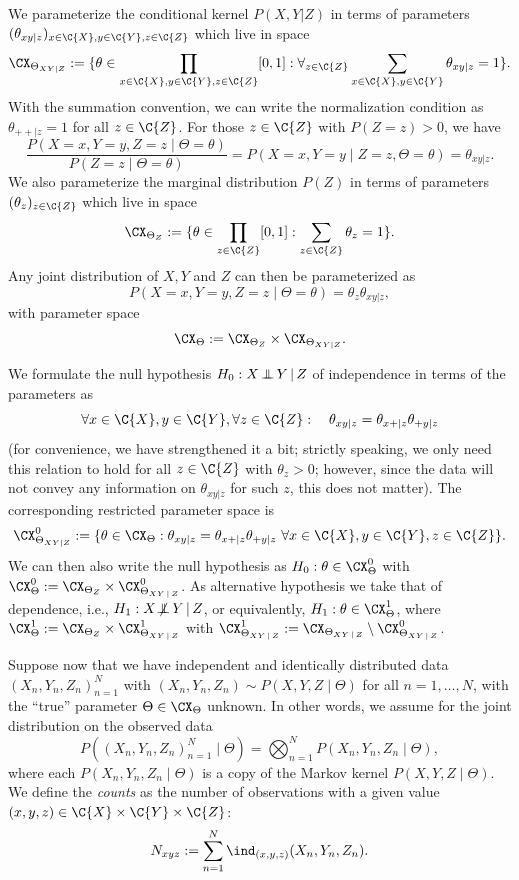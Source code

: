 We parameterize the conditional kernel $P(X,Y | Z)$ in terms of parameters
$(\theta_{xy|z})_{x\in\C{X},y\in\C{Y},z\in\C{Z}}$ which live in space
$$\CX_{\Theta_{XY|Z}} := %
\{ \theta \in \prod_{x\in\C{X},y\in\C{Y},z\in\C{Z}} [0,1] : \forall_{z\in\C{Z}} \sum_{x\in\C{X},y\in\C{Y}} \theta_{xy|z} = 1\}.$$
With the summation convention, we can write the normalization condition as $\theta_{++|z} = 1$ for all $z \in \C{Z}$.
For those $z\in\C{Z}$ with $P(Z = z) > 0$, we have 
$$\frac{P(X = x, Y = y, Z = z \mid \Theta = \theta)}{P(Z=z \mid \Theta=\theta)} = P(X = x, Y = y \mid Z=z, \Theta=\theta) = \theta_{xy|z}.$$
We also parameterize the marginal distribution $P(Z)$ in terms of parameters
$(\theta_z)_{z\in\C{Z}}$ which live in space
$$\CX_{\Theta_Z} := \{ \theta \in \prod_{z\in\C{Z}} [0,1] : \sum_{z\in\C{Z}} \theta_z = 1\}.$$
Any joint distribution of $X,Y$ and $Z$ can then be parameterized as
$$P(X=x,Y=y,Z=z \mid \Theta=\theta) = \theta_z \theta_{xy|z},$$
with parameter space
$$\CX_\Theta := \CX_{\Theta_Z}\times \CX_{\Theta_{XY|Z}}.$$

We formulate the null hypothesis $H_0 : X \operatorname*{\perp\mkern-11mu\perp} Y \operatorname*{|} Z$ of independence in terms of the parameters as
$$\forall x \in \C{X}, y \in \C{Y}, \forall z \in \C{Z}: \quad \theta_{xy|z} = \theta_{x+|z} \theta_{+ y|z}$$
(for convenience, we have strengthened it a bit; strictly speaking, we only need this relation to hold
for all $z \in \C{Z}$ with $\theta_z > 0$; however, since the data will not convey any information on $\theta_{xy|z}$ for such $z$, this does not matter).
The corresponding restricted parameter space is
$$\CX_{\Theta_{XY|Z}}^0 := \{\theta \in \CX_\Theta : \theta_{xy|z} = \theta_{x+|z} \theta_{+ y|z}\ \forall x \in \C{X}, y \in \C{Y}, z \in \C{Z}\}.$$
We can then also write the null hypothesis as $H_0 : \theta \in \CX_\Theta^0$ with
$\CX_\Theta^0 := \CX_{\Theta_Z} \times \CX_{\Theta_{XY\given Z}}^0$.
As alternative hypothesis we take that of dependence, i.e., $H_1 : X \operatorname*{\not\mkern-2mu\perp\mkern-11mu\perp} Y \operatorname*{|} Z$, or equivalently,
$H_1 : \theta \in \CX_\Theta^1$, where
$\CX_\Theta^1 := \CX_{\Theta_Z} \times \CX_{\Theta_{XY\given Z}}^1$ 
with $\CX_{\Theta_{XY\given Z}}^1 := \CX_{\Theta_{XY\given Z}} \setminus \CX_{\Theta_{XY\given Z}}^0$.

Suppose now that we have independent and identically distributed data $(X_n,Y_n,Z_n)_{n=1}^N$ with
$(X_n,Y_n,Z_n) \sim P(X,Y,Z \mid \Theta)$ for all $n=1,\dots,N$, with the ``true'' parameter $\Theta \in \CX_\Theta$ unknown.
In other words, we assume for the joint distribution on the observed data
$$P((X_n,Y_n,Z_n)_{n=1}^N \mid \Theta) = \bigotimes_{n=1}^N P(X_n,Y_n,Z_n \mid \Theta),$$
where each $P(X_n,Y_n,Z_n \mid \Theta)$ is a copy of the Markov kernel $P(X,Y,Z \mid \Theta)$.
We define the \emph{counts} as the number of observations with a given value $(x,y,z)\in\C{X}\times\C{Y}\times\C{Z}$:
$$N_{xyz} := \sum_{n=1}^N \ind_{(x,y,z)}(X_n,Y_n,Z_n).$$

